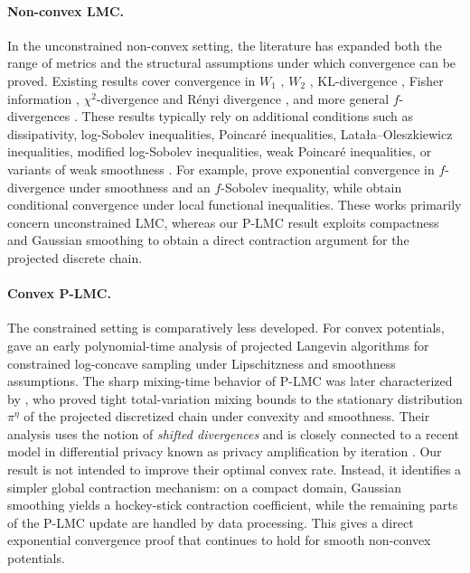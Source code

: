 \documentclass[10pt, journal]{IEEEtran}
\begin{document}
\paragraph{Non-convex LMC.} In the unconstrained non-convex setting, the literature has expanded both the range of metrics and the structural assumptions under which convergence can be proved. Existing results cover convergence in $W_1$ \cite{raginsky2017non}, $W_2$ \cite{chau2021stochastic}, KL-divergence \cite{vempala2019advances}, Fisher information \cite{balasubramanian2022towards}, $\chi^2$-divergence and R\'enyi divergence \cite{erdogdu2022chisquared}, and more general $f$-divergences \cite{mitra2025fast}. These results typically rely on additional conditions such as dissipativity, log-Sobolev inequalities, Poincar\'e inequalities, Lata\l{}a--Oleszkiewicz inequalities, modified log-Sobolev inequalities, weak Poincar\'e inequalities, or variants of weak smoothness \cite{vempala2019advances,erdogdu2021convergence,chewi2022analysis,Hosseini2023Towards,nguyen2023unadjusted}. For example, \cite{mitra2025fast} prove exponential convergence in $f$-divergence under smoothness and an $f$-Sobolev inequality, while \cite{cheng2024fast} obtain conditional convergence under local functional inequalities. These works primarily concern unconstrained LMC, whereas our P-LMC result exploits compactness and Gaussian smoothing to obtain a direct contraction argument for the projected discrete chain. 

\paragraph{Convex P-LMC.} The constrained setting is comparatively less developed. For convex potentials, \cite{bubeck2018sampling} gave an early polynomial-time analysis of projected Langevin algorithms for constrained log-concave sampling under Lipschitzness and smoothness assumptions. The sharp mixing-time behavior of P-LMC was later characterized by \cite{altschuler2022resolving}, who proved tight total-variation mixing bounds to the stationary distribution $\pi^\eta$ of the projected discretized chain under convexity and smoothness. Their analysis uses the notion of \textit{shifted divergences} and is closely connected to a recent model in differential privacy known as privacy amplification by iteration \cite{feldman2018privacy}. Our result is not intended to improve their optimal convex rate. Instead, it identifies a simpler global contraction mechanism: on a compact domain, Gaussian smoothing yields a hockey-stick contraction coefficient, while the remaining parts of the P-LMC update are handled by data processing. This gives a direct exponential convergence proof that continues to hold for smooth non-convex potentials. 
\end{document}
